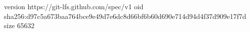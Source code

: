 version https://git-lfs.github.com/spec/v1
oid sha256:d97c5a673baa764bce9e49d7e6dc8d66bf6b60d690e714d94d4f37d909e17f7d
size 65632
